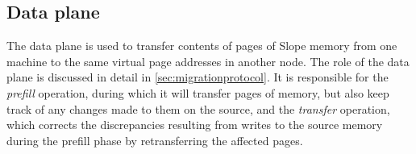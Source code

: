 

\subsection{Data plane}
The data plane is used to transfer contents of pages of Slope
memory from one machine to the same virtual page addresses in another node.
The role of the data plane is discussed in detail in \autoref{sec:migrationprotocol}.
It is responsible for the \emph{prefill} operation, during which it will
transfer pages of memory, but also keep track of any changes made to them on
the source, and the \emph{transfer} operation, which corrects the discrepancies
resulting from writes to the source memory during the prefill phase by
retransferring the affected pages.


